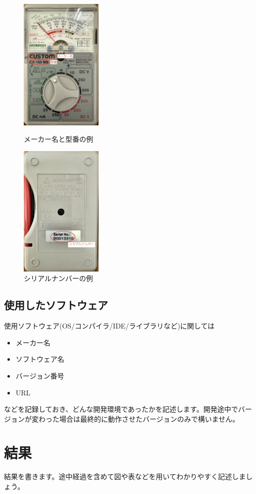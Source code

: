 \documentclass[dvipdfmx, a4paper]{jsarticle}
\begin{document}
\begin{figure}[htbp]
    \centering
    \includegraphics[width=4cm, clip]{tester_front.jpg}
    \caption{メーカー名と型番の例}
    \label{fig:tester_front}

    \includegraphics[width=4cm, clip]{tester_back.jpg}
    \caption{シリアルナンバーの例}
    \label{fig:tester_back}
\end{figure}

\subsection{使用したソフトウェア}
使用ソフトウェア(OS/コンパイラ/IDE/ライブラリなど)に関しては
\begin{itemize}
    \item メーカー名
    \item ソフトウェア名
    \item バージョン番号
    \item URL
\end{itemize}

などを記録しておき、どんな開発環境であったかを記述します。開発途中でバージョンが変わった場合は最終的に動作させたバージョンのみで構いません。

\section{結果}
結果を書きます。途中経過を含めて図や表などを用いてわかりやすく記述しましょう。
\end{document}
